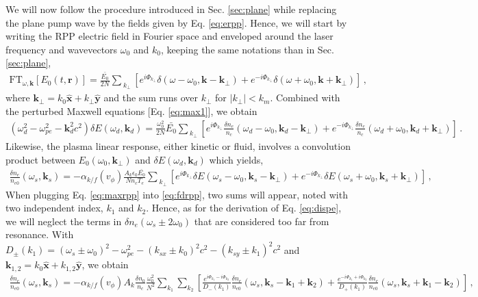 \documentclass[
 reprint,
 amsmath,amssymb,
 aps,
]{revtex4-1}
\begin{document}
\begin{widetext}
We will now follow the procedure introduced in Sec. \ref{sec:plane} while replacing the plane pump wave by the fields given by Eq. \eqref{eq:erpp}. Hence, we will start by writing the RPP electric field in Fourier space and enveloped around the laser frequency and wavevectors $\omega_0$ and $k_0$, keeping the same notations than in Sec. \ref{sec:plane},
\begin{align}
\mathrm{FT}_{\omega,\mathbf{k} }[E_0(t,\mathbf{r}) ]= \frac{\bar{E_0}}{2N} \sum_{\ k_{\perp} }[ e^{i\Phi_{k_\perp}}\delta(\omega-\omega_0, \mathbf{k}-\mathbf{k}_\perp)    + e^{-i\Phi_{k_\perp}}\delta(\omega+\omega_0, \mathbf{k}+\mathbf{k}_\perp) ]
\, , \label{eq:erppf}
\end{align}
 where $\mathbf{k}_\perp= k_0\hat{\mathbf{x}} +k_\perp \hat{\mathbf{y}}$ and the sum runs over $k_\perp$ for $\vert k_\perp\vert  <k_m$.
 Combined with the perturbed Maxwell equations [Eq. \eqref{eq:max1}], we obtain
 \begin{align}
    (\omega_d^2 - \omega_{pe}^2 -\mathbf{k}_d^2c^2)\delta E(\omega_d,\mathbf{k}_d) = \frac{\omega_0^2}{2N} \bar{E_0} \sum_{\ k_{\perp} }   \left[e^{i\Phi_{k_\perp}}\frac{\delta n_e }{n_c}(\omega_d-\omega_0, \mathbf{k}_d-\mathbf{k}_\perp) +e^{-i\Phi_{k_\perp}}\frac{\delta n_e }{n_c}(\omega_d+\omega_0, \mathbf{k}_d+\mathbf{k}_\perp) \right] \, .\label{eq:maxrpp}
\end{align}
Likewise, the plasma linear response, either kinetic or fluid, involves a convolution product between $E_0(\omega_0,\mathbf{k}_\perp)$ and $\delta E(\omega_d,\mathbf{k}_d)$ which yields,
\begin{align}
   \frac{\delta n_e }{n_{e0}}(\omega_s,\mathbf{k}_s) = -\alpha_{k/f}(v_\phi) \frac{A_k\epsilon_0\bar{E_0}}{Nn_c T_e} \sum_{\ k_{\perp} }     \left[e^{i\Phi_{k_\perp}}\delta E(\omega_s-\omega_0, \mathbf{k}_s-\mathbf{k}_{\perp}) +e^{-i\Phi_{k_\perp}}\delta E(\omega_s+\omega_0, \mathbf{k}_s+\mathbf{k}_{\perp}) \right] \, ,\label{eq:fdrpp} 
\end{align}
When plugging Eq. \eqref{eq:maxrpp} into \eqref{eq:fdrpp}, two sums will appear, noted with two independent index, $k_1$ and $k_2$. Hence, as for the derivation of Eq. \eqref{eq:dispe}, we will neglect the terms in $\delta n_e(\omega_s\pm 2\omega_0)$ that are considered too far from resonance. With $D_\pm(k_{1})= (\omega_s\pm\omega_0)^2 - \omega_{pe}^2 -( k_{sx}\pm k_0) ^2c^2 -( k_{sy}\pm k_{1}) ^2c^2$ and $\mathbf{k}_{1,2}= k_0\hat{\mathbf{x}} +k_{1,2} \hat{\mathbf{y}}$, we obtain
\begin{align}
   \frac{\delta n_e }{n_{e0}}(\omega_s,\mathbf{k}_s) = -\alpha_{k/f}(v_\phi)A_k \frac{\delta n_0}{n_c} \frac{\omega_0^2}{N^2}\sum_{ k_{1} } \sum_{ k_{2} }        \left[ \frac{e^{i\Phi_{k_1}-i\Phi_{k_2}} }{D_-(k_{1})}\frac{\delta n_e }{n_{e0}}(\omega_s,\mathbf{k}_s-\mathbf{k}_{1}+\mathbf{k}_{2}) +\frac{e^{-i\Phi_{k_1}+i\Phi_{k_2}}}{D_+(k_{1})} \frac{\delta n_e }{n_{e0}}(\omega_s,\mathbf{k}_s+\mathbf{k}_{1}-\mathbf{k}_{2}) \right] \, ,\label{eq:fddrpp} 
\end{align}
 \end{widetext}
 
\end{document}
